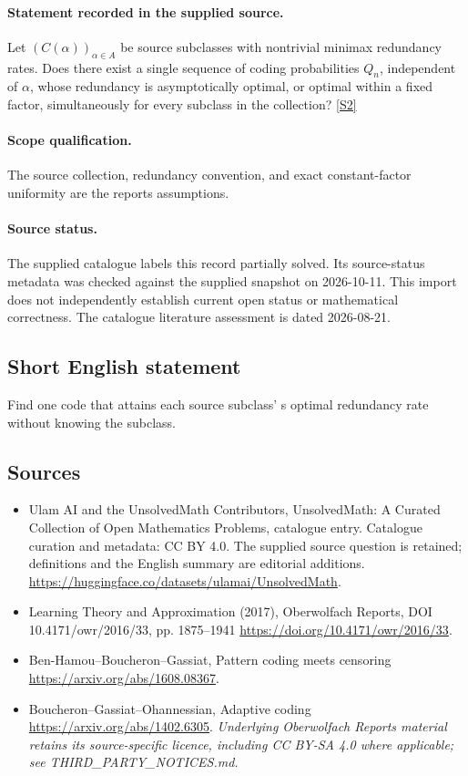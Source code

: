 \documentclass[11pt]{article}
\begin{document}
\paragraph{Statement recorded in the supplied source.}
Let $(C(\alpha))_{\alpha\in A}$ be source subclasses with nontrivial minimax redundancy rates. Does there exist a single sequence of coding probabilities $Q_n$, independent of $\alpha$, whose redundancy is asymptotically optimal, or optimal within a fixed factor, simultaneously for every subclass in the collection? \href{https://doi.org/10.4171/owr/2016/33}{[S2]}
\paragraph{Scope qualification.}
The source collection, redundancy convention, and exact constant-factor uniformity are the report\textquotesingle s assumptions.
\paragraph{Source status.}
The supplied catalogue labels this record partially solved. Its source-status metadata was checked against the supplied snapshot on 2026-10-11. This import does not independently establish current open status or mathematical correctness. The catalogue literature assessment is dated 2026-08-21.
\subsection{Short English statement}
Find one code that attains each source subclass' s optimal redundancy rate without knowing the subclass.
\subsection{Sources}
\begin{itemize}
\item[S1] Ulam AI and the UnsolvedMath Contributors, UnsolvedMath: A Curated Collection of Open Mathematics Problems, catalogue entry. Catalogue curation and metadata: CC BY 4.0. The supplied source question is retained; definitions and the English summary are editorial additions.
\url{https://huggingface.co/datasets/ulamai/UnsolvedMath}.
\item[S2] Learning Theory and Approximation (2017), Oberwolfach Reports, DOI 10.4171/owr/2016/33, pp. 1875--1941
\url{https://doi.org/10.4171/owr/2016/33}.
\item[S3] Ben-Hamou--Boucheron--Gassiat, Pattern coding meets censoring
\url{https://arxiv.org/abs/1608.08367}.
\item[S4] Boucheron--Gassiat--Ohannessian, Adaptive coding
\url{https://arxiv.org/abs/1402.6305}.
\textit{Underlying Oberwolfach Reports material retains its source-specific licence, including CC BY-SA 4.0 where applicable; see THIRD\_PARTY\_NOTICES.md.}
\end{itemize}
\end{document}

